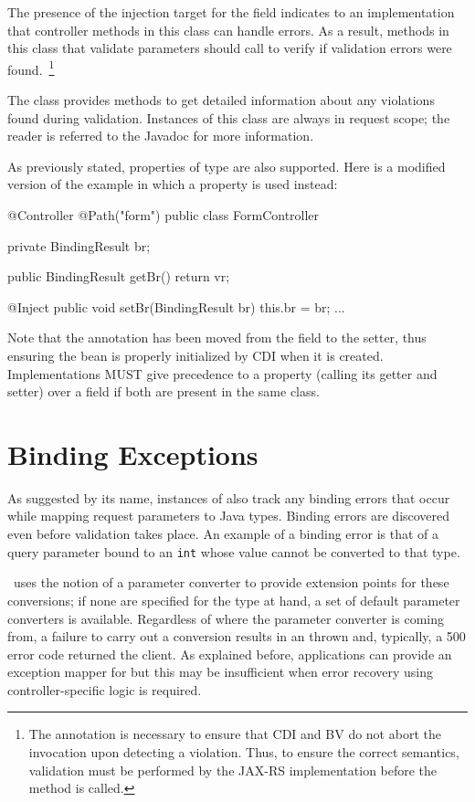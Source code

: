 The presence of the injection target for the field 
 indicates to an implementation that controller methods in this
class can handle errors. As a result, methods in this class
that validate parameters should call  to verify if
validation errors were found.~\footnote{The  
annotation is necessary to ensure that CDI and BV do not abort the
invocation upon detecting a violation. Thus, to ensure the correct semantics, 
validation must be performed by the JAX-RS implementation before the method 
is called.}

The class  provides methods to get detailed information 
about any violations 
found during validation. Instances of this class are always in request
scope; the reader is referred to the Javadoc for more information.

As previously stated, properties of type  
are also supported. Here is a modified version of the example in which
a property is used instead:

\begin{listing}{1}
@Controller
@Path("form")
public class FormController {

    private BindingResult br;
    
    public BindingResult getBr() {
        return vr;
    }

    @Inject
    public void setBr(BindingResult br) {
        this.br = br;
    }
    ...
}
\end{listing}

Note that the  annotation has been moved from the field to the setter,
thus ensuring the bean is properly initialized by CDI when it is
created. Implementations MUST give precedence to a property (calling its getter and
setter) over a field if both are present in the same class.
 
\section{Binding Exceptions}
\label{binding_exceptions}

As suggested by its name, instances of  also track any 
binding errors that occur while mapping request parameters to Java
types. Binding errors are discovered even before validation takes place. An
example of a binding error is that of a query parameter bound to an {\tt int} whose
value cannot be converted to that type. 

 \jaxrs\ uses the notion of a parameter converter
to provide extension points for these conversions; if none are specified for
the type at hand, a set of default parameter converters is available. Regardless
of where the parameter converter is coming from, a failure to carry out a 
conversion results in an  thrown and, typically,
a 500 error code returned the client. As explained before, applications can provide
an exception mapper for  but this may be
insufficient when error recovery using controller-specific logic is required. 

